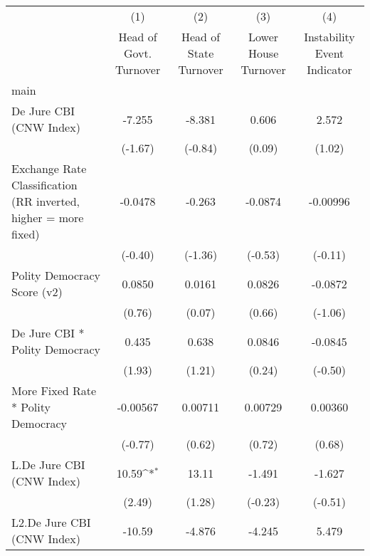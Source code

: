 {
\def\sym#1{\ifmmode^{#1}\else\(^{#1}\)\fi}
\begin{longtable}{l*{4}{c}}
\hline\hline\endfirsthead\hline\endhead\hline\endfoot\endlastfoot
                &\multicolumn{1}{c}{(1)}&\multicolumn{1}{c}{(2)}&\multicolumn{1}{c}{(3)}&\multicolumn{1}{c}{(4)}\\
                &\multicolumn{1}{c}{Head of Govt. Turnover}&\multicolumn{1}{c}{Head of State Turnover}&\multicolumn{1}{c}{Lower House Turnover}&\multicolumn{1}{c}{Instability Event Indicator}\\
\hline
main            &                  &                  &                  &                  \\
De Jure CBI (CNW Index)&   -7.255         &   -8.381         &    0.606         &    2.572         \\
                &  (-1.67)         &  (-0.84)         &   (0.09)         &   (1.02)         \\
[1em]
Exchange Rate Classification (RR inverted, higher = more fixed)&  -0.0478         &   -0.263         &  -0.0874         & -0.00996         \\
                &  (-0.40)         &  (-1.36)         &  (-0.53)         &  (-0.11)         \\
[1em]
Polity Democracy Score (v2)&   0.0850         &   0.0161         &   0.0826         &  -0.0872         \\
                &   (0.76)         &   (0.07)         &   (0.66)         &  (-1.06)         \\
[1em]
De Jure CBI * Polity Democracy&    0.435         &    0.638         &   0.0846         &  -0.0845         \\
                &   (1.93)         &   (1.21)         &   (0.24)         &  (-0.50)         \\
[1em]
More Fixed Rate * Polity Democracy& -0.00567         &  0.00711         &  0.00729         &  0.00360         \\
                &  (-0.77)         &   (0.62)         &   (0.72)         &   (0.68)         \\
[1em]
L.De Jure CBI (CNW Index)&    10.59\sym{*}  &    13.11         &   -1.491         &   -1.627         \\
                &   (2.49)         &   (1.28)         &  (-0.23)         &  (-0.51)         \\
[1em]
L2.De Jure CBI (CNW Index)&   -10.59         &   -4.876         &   -4.245         &    5.479         \\

\end{longtable}}
